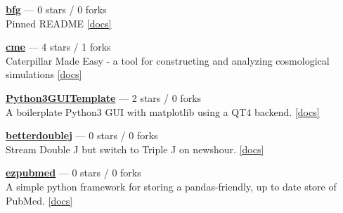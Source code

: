 \item \href{https://github.com/bgriffen/bfg}{{\bf bfg}} --- 0 stars / 0 forks \\
Pinned README \href{None}{[docs]}

\item \href{https://github.com/bgriffen/cme}{{\bf cme}} --- 4 stars / 1 forks \\
Caterpillar Made Easy - a tool for constructing and analyzing cosmological simulations \href{}{[docs]}

\item \href{https://github.com/bgriffen/Python3GUITemplate}{{\bf Python3GUITemplate}} --- 2 stars / 0 forks \\
A boilerplate Python3 GUI with matplotlib using a QT4 backend. \href{http://brendangriffen.com/creating-a-GUI-in-Python/}{[docs]}

\item \href{https://github.com/bgriffen/betterdoublej}{{\bf betterdoublej}} --- 0 stars / 0 forks \\
Stream Double J but switch to Triple J on newshour. \href{None}{[docs]}

\item \href{https://github.com/bgriffen/ezpubmed}{{\bf ezpubmed}} --- 0 stars / 0 forks \\
A simple python framework for storing a pandas-friendly, up to date store of PubMed. \href{}{[docs]}